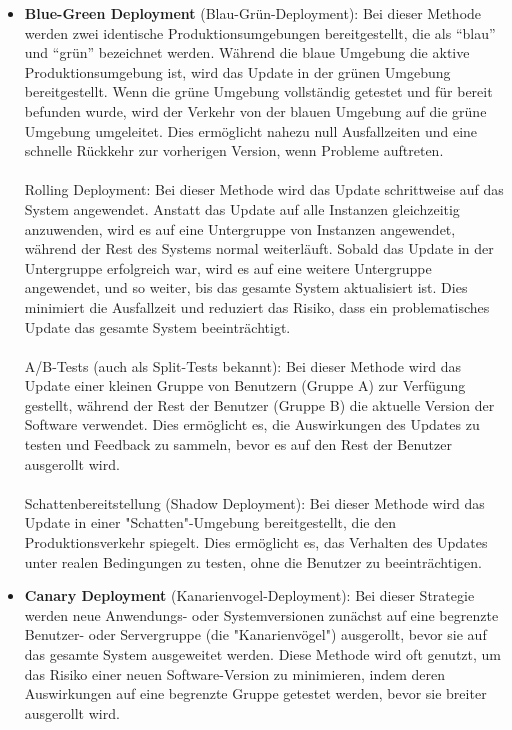 \begin{itemize}
\item \textbf{Blue-Green Deployment} (Blau-Grün-Deployment):
Bei dieser Methode werden zwei identische Produktionsumgebungen bereitgestellt, die als \enquote{blau} und \enquote{grün} bezeichnet werden. Während die blaue Umgebung die aktive Produktionsumgebung ist, wird das Update in der grünen Umgebung bereitgestellt. Wenn die grüne Umgebung vollständig getestet und für bereit befunden wurde, wird der Verkehr von der blauen Umgebung auf die grüne Umgebung umgeleitet. Dies ermöglicht nahezu null Ausfallzeiten und eine schnelle Rückkehr zur vorherigen Version, wenn Probleme auftreten.
\\\\
Rolling Deployment: Bei dieser Methode wird das Update schrittweise auf das System angewendet. Anstatt das Update auf alle Instanzen gleichzeitig anzuwenden, wird es auf eine Untergruppe von Instanzen angewendet, während der Rest des Systems normal weiterläuft. Sobald das Update in der Untergruppe erfolgreich war, wird es auf eine weitere Untergruppe angewendet, und so weiter, bis das gesamte System aktualisiert ist. Dies minimiert die Ausfallzeit und reduziert das Risiko, dass ein problematisches Update das gesamte System beeinträchtigt.
\\\\
A/B-Tests (auch als Split-Tests bekannt): Bei dieser Methode wird das Update einer kleinen Gruppe von Benutzern (Gruppe A) zur Verfügung gestellt, während der Rest der Benutzer (Gruppe B) die aktuelle Version der Software verwendet. Dies ermöglicht es, die Auswirkungen des Updates zu testen und Feedback zu sammeln, bevor es auf den Rest der Benutzer ausgerollt wird.
\\\\
Schattenbereitstellung (Shadow Deployment): Bei dieser Methode wird das Update in einer "Schatten"-Umgebung bereitgestellt, die den Produktionsverkehr spiegelt. Dies ermöglicht es, das Verhalten des Updates unter realen Bedingungen zu testen, ohne die Benutzer zu beeinträchtigen.
\item \textbf{Canary Deployment} (Kanarienvogel-Deployment):
Bei dieser Strategie werden neue Anwendungs- oder Systemversionen zunächst auf eine begrenzte Benutzer- oder Servergruppe (die "Kanarienvögel") ausgerollt, bevor sie auf das gesamte System ausgeweitet werden. Diese Methode wird oft genutzt, um das Risiko einer neuen Software-Version zu minimieren, indem deren Auswirkungen auf eine begrenzte Gruppe getestet werden, bevor sie breiter ausgerollt wird.
\\\\

\end{itemize}
